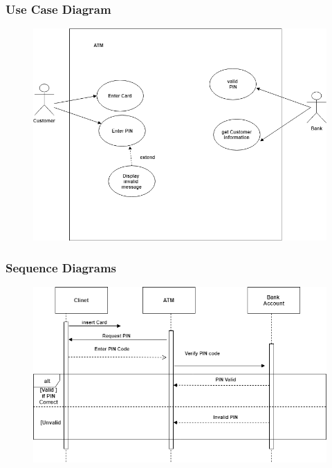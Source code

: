\documentclass{article}
\begin{document}
		\newpage\subsubsection{Use Case Diagram}
			\begin{figure}[h!]
			  \includegraphics[width=\linewidth]{img/validate_usecase.png}
			\end{figure}

		\newpage\subsubsection{Sequence Diagrams}
		\begin{figure}[h!]
		  \includegraphics[width=\linewidth]{img/validate_sequence.png}
		\end{figure}
\end{document}
